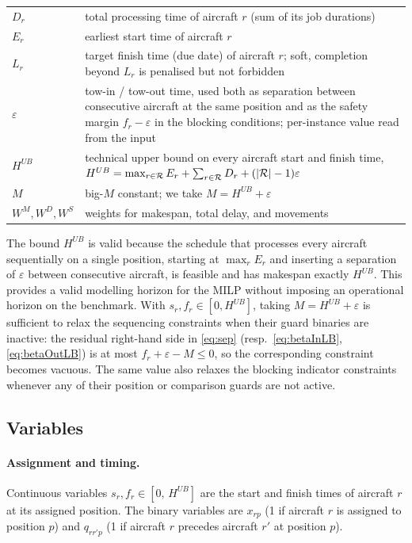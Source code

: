 \begin{tabular}{@{}l@{\quad}p{}@{}}
  $D_r$
    & total processing time of aircraft $r$ (sum of its job durations) \\
  $E_r$
    & earliest start time of aircraft $r$ \\
  $L_r$
    & target finish time (due date) of aircraft $r$; soft, completion
      beyond $L_r$ is penalised but not forbidden \\
  $\varepsilon$
    & tow-in / tow-out time, used both as separation between consecutive
      aircraft at the same position and as the safety margin
      $f_r - \varepsilon$ in the blocking conditions; per-instance value
      read from the input \\
  $H^{UB}$
    & technical upper bound on every aircraft start and finish time,
      $H^{UB} = \max_{r \in \mathcal{R}} E_r + \sum_{r \in \mathcal{R}} D_r +
      (|\mathcal{R}| - 1)\varepsilon$ \\
  $M$
    & big-$M$ constant; we take $M = H^{UB} + \varepsilon$ \\
  $W^M, W^D, W^S$
    & weights for makespan, total delay, and movements \\
\end{tabular}

\smallskip
\noindent
The bound $H^{UB}$ is valid because the schedule that processes every
aircraft sequentially on a single position, starting at $\max_r E_r$ and
inserting a separation of $\varepsilon$ between consecutive aircraft, is
feasible and has makespan exactly $H^{UB}$.  This provides a valid
modelling horizon for the MILP without imposing an operational horizon
on the benchmark.  With $s_r, f_r \in [0, H^{UB}]$, taking $M = H^{UB} +
\varepsilon$ is sufficient to relax the sequencing constraints when
their guard binaries are inactive: the residual right-hand side in
\eqref{eq:sep} (resp.\ \eqref{eq:betaInLB}, \eqref{eq:betaOutLB}) is at
most $f_r + \varepsilon - M \le 0$, so the corresponding constraint
becomes vacuous.  The same value also relaxes the blocking indicator
constraints whenever any of their position or comparison guards are not
active.

\subsection*{Variables}

\paragraph{Assignment and timing.}
Continuous variables $s_r, f_r \in [0,\, H^{UB}]$ are the start and
finish times of aircraft $r$ at its assigned position.  The binary
variables are $x_{rp}$ (1 if aircraft $r$ is assigned to position $p$)
and $q_{rr'p}$ (1 if aircraft $r$ precedes aircraft $r'$ at position
$p$).


